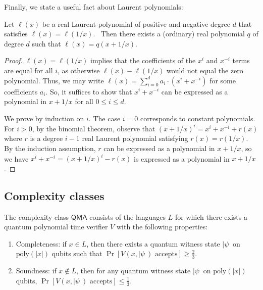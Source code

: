 Finally, we state a useful fact about Laurent polynomials:

\begin{lemma}
\label{lem:symmetric} Let $\ell (x)$ be a real Laurent polynomial of positive
and negative degree $d$ that satisfies $\ell (x)=\ell (1/x)$. \ Then there exists a (ordinary) real
polynomial $q$ of degree $d$ such that $\ell (x)=q(x+1/x)$.
\end{lemma}

\begin{proof}
$\ell(x) = \ell(1/x)$ implies that the coefficients of the $x^i$ and $x^{-i}$ terms are equal for all $i$, as otherwise $\ell(x) - \ell(1/x)$ would not equal the zero polynomial. Thus, we may write $\ell(x) = \sum_{i=0}^d a_i \cdot (x^i + x^{-i})$ for some coefficients $a_i$. So, it suffices to show that $x^i + x^{-i}$ can be expressed as a polynomial in $x + 1/x$ for all $0 \le i \le d$.

We prove by induction on $i$. The case $i = 0$ corresponds to constant polynomials. For $i > 0$, by the binomial theorem, observe that $(x + 1/x)^i = x^i + x^{-i} + r(x)$ where $r$ is a degree $i - 1$ real Laurent polynomial satisfying $r(x) = r(1/x)$. By the induction assumption, $r$ can be expressed as a polynomial in $x + 1/x$, so we have $x^i + x^{-i} = (x + 1/x)^i - r(x)$ is expressed as a polynomial in $x + 1/x$.
\end{proof}

%
\subsection{Complexity classes}

\begin{definition}
\label{def:qma}
The complexity class $\mathsf{QMA}$ consists of the
languages $L$ for which there exists a quantum polynomial time
verifier $V$ with the following properties:

\begin{enumerate}
\item Completeness: if $x \in L$, then there exists a quantum witness state $|\psi\>$ on $\mathrm{poly}(|x|)$ qubits such that $\Pr\left[V(x, |\psi\>) \text{ accepts}\right] \ge \frac{2}{3}$.

\item Soundness: if $x \not\in L$, then for any quantum witness state $|\psi\>$ on $\mathrm{poly}(|x|)$ qubits, $\Pr\left[V(x, |\psi\>) \text{ accepts}\right] \le \frac{1}{3}$.
\end{enumerate}
\end{definition}


